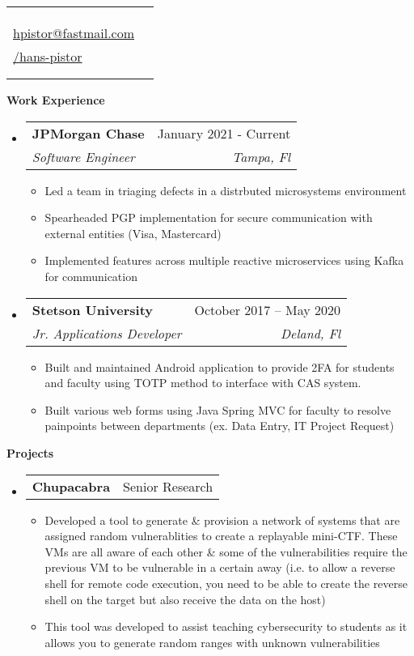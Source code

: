 \documentclass[letterpaper,12pt]{article}[leftmargin=*]
\makeatletter
\def \fullname {Hans Pistor}
\def \subtitle {}
\def \linkedinicon {\faLinkedin}
\def \linkedinlink {https://www.linkedin.com/in/hans-pistor-172914137/}
\def \linkedintext {/hans-pistor}
\def \phoneicon {\faPhone}
\def \phonetext {+1-407-443-5855}
\def \emailicon {\faEnvelope}
\def \emaillink {mailto:hpistor@fastmail.com}
\def \emailtext {hpistor@fastmail.com}
\def \githubicon {\faGithub}
\def \githublink {https://github.com/hans-pistor}
\def \githubtext {/hans-pistor}
\def \headertype {\singlecol} %
\def \entryspacing {-0pt}
\def \linkedin {\linkedinicon \hspace{3pt}\href{\linkedinlink}{\linkedintext}}
\def \phone {\phoneicon \hspace{3pt}{ \phonetext}}
\def \email {\emailicon \hspace{3pt}\href{\emaillink}{\emailtext}}
\def \github {\githubicon \hspace{3pt}\href{\githublink}{\githubtext}}
\renewcommand{\section}[2]{\vspace{5pt}
  \colorbox{secondary}{\color{white}\raggedbottom\normalsize\textbf{{#1}{\hspace{7pt}#2}}}
}
\newcommand{\resumeEntryStart}{\begin{itemize}[leftmargin=2.5mm]}
\newcommand{\resumeEntryEnd}{\end{itemize}\vspace{\entryspacing}}
\newcommand{\resumeItemListStart}{\begin{itemize}[leftmargin=4.5mm]}
\newcommand{\resumeItemListEnd}{\end{itemize}}
\newcommand{\resumeItem}[1]{
  \item\small{
    {#1 \vspace{-2pt}}
  }
}
\newcommand{\resumeEntryTSDL}[4]{
  \vspace{-1pt}\item[]
    \begin{tabularx}{0.97\textwidth}{X@{\hspace{60pt}}r}
      \textbf{\color{primary}#1} & {\firabook\color{accent}\small#2} \\
      \textit{\color{accent}\small#3} & \textit{\color{accent}\small#4} \\
    \end{tabularx}\vspace{-6pt}
}
\newcommand{\resumeEntryTD}[2]{
  \vspace{-1pt}\item[]
    \begin{tabularx}{0.97\textwidth}{X@{\hspace{60pt}}r}
      \textbf{\color{primary}#1} & {\firabook\color{accent}\small#2} \\
    \end{tabularx}\vspace{-6pt}
}
\newcommand{\doublecol}[6]{
  \begin{tabularx}{\textwidth}{Xr}
    {
      \begin{tabular}[c]{l}
        \fontsize{35}{45}\selectfont{\color{primary}{{\textbf{\fullname}}}} \\
        {\textit{\subtitle}} %
      \end{tabular}
    } & {
      \begin{tabular}[c]{l@{\hspace{1.5em}}l}
        {\small#4} & {\small#1} \\
        {\small#5} & {\small#2} \\
        {\small#6} & {\small#3}
      \end{tabular}
    }
  \end{tabularx}
}
\newcommand{\singlecol}[6]{
  \begin{tabularx}{\textwidth}{Xr}
    {
      \begin{tabular}[b]{l}
        \fontsize{35}{45}\selectfont{\color{primary}{{\textbf{\fullname}}}} \\
        {\textit{\subtitle}} %
      \end{tabular}
    } & {
      \begin{tabular}[c]{l}
        {\small#1} \\
        {\small#2} \\
        {\small#3} \\
        {\small#4} \\
        {\small#5} \\
        {\small#6}
      \end{tabular}
    }
  \end{tabularx}
}
\makeatother
\begin{document}


\headertype{\github}{\phone}{\email}{\linkedin}{}{} %
\vspace{-30pt} %


\section{\faPieChart}{Work Experience}

  \resumeEntryStart
    \resumeEntryTSDL
      {JPMorgan Chase}{January 2021 - Current}
      {Software Engineer}{Tampa, Fl}
    \resumeItemListStart
      \resumeItem {Led a team in triaging defects in a distrbuted microsystems environment}
      \resumeItem {Spearheaded PGP implementation for secure communication with external entities (Visa, Mastercard)}
      \resumeItem{Implemented features across multiple reactive microservices using Kafka for communication}
    \resumeItemListEnd
  \resumeEntryEnd

  \resumeEntryStart
    \resumeEntryTSDL
      {Stetson University}{October 2017 -- May 2020}
      {Jr. Applications Developer }{Deland, Fl}
    \resumeItemListStart
      \resumeItem {Built and maintained Android application to provide 2FA for students and faculty using TOTP method to interface with CAS system.}
      \resumeItem {Built various web forms using Java Spring MVC for faculty to resolve painpoints between departments (ex. Data Entry, IT Project Request)}
    \resumeItemListEnd
  \resumeEntryEnd



\section{\faFlask}{Projects}

  \resumeEntryStart
    \resumeEntryTD
      {Chupacabra}{Senior Research}
    \resumeItemListStart
      \resumeItem{Developed a tool to generate \& provision a network of systems that are assigned random vulnerablities to create a replayable mini-CTF. These VMs are all aware of each other \& some of the vulnerabilities require the previous VM to be vulnerable in a certain away (i.e. to allow a reverse shell for remote code execution, you need to be able to create the reverse shell on the target but also receive the data on the host)}
      \resumeItem{This tool was developed to assist teaching cybersecurity to students as it allows you to generate random ranges with unknown vulnerabilities}
    \resumeItemListEnd
  \resumeEntryEnd
\end{document}
